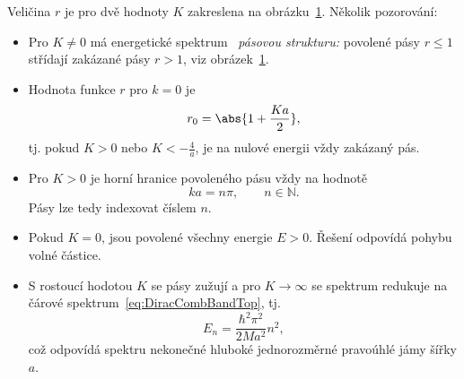 \begin{solution}
\begin{enumerate}
		\begin{figure}[!htbp]
            \begin{subfigure}{0.49\linewidth}
                \centering{}
            \end{subfigure}
            \hfill
            \begin{subfigure}{0.49\linewidth}
                \centering{}
            \end{subfigure}
			\label{fig:DiracCombBandCondition}
		\end{figure}

		Veličina $r$ je pro dvě hodnoty $K$ zakreslena na obrázku~\ref{fig:DiracCombBandCondition}.
		Několik pozorování:
		\begin{itemize}
		\item
			Pro $K\neq0$ má energetické spektrum ~\emph{pásovou strukturu:} povolené pásy $r\leq1$ střídají zakázané pásy $r>1$, viz obrázek~\ref{fig:DiracCombBandCondition}.
		
		\item
			Hodnota funkce $r$ pro $k=0$ je
			\begin{equation}
				r_{0}=\abs{1+\frac{Ka}{2}},
			\end{equation}
			tj. pokud $K>0$ nebo $K<-\frac{4}{a}$, je na nulové energii vždy zakázaný pás.
			
		\item
			Pro $K>0$ je horní hranice povoleného pásu vždy na hodnotě
			\begin{equation}\label{eq:DiracCombBandTop}
				ka=n\pi,\qquad n\in\mathbb{N}.
			\end{equation}
			Pásy lze tedy indexovat číslem $n$.

		\item
			Pokud $K=0$, jsou povolené všechny energie $E>0$.
			Řešení odpovídá pohybu volné částice.
			
		\item
			S rostoucí hodotou $K$ se pásy zužují a pro $K\rightarrow\infty$ se spektrum redukuje na čárové spektrum~\eqref{eq:DiracCombBandTop}, tj.
			\begin{equation}
				E_{n}=\frac{\hbar^{2}\pi^{2}}{2Ma^{2}}n^{2},
			\end{equation}
			což odpovídá spektru nekonečné hluboké jednorozměrné pravoúhlé jámy šířky $a$.
		\end{itemize}		


\end{enumerate}
\end{solution}
